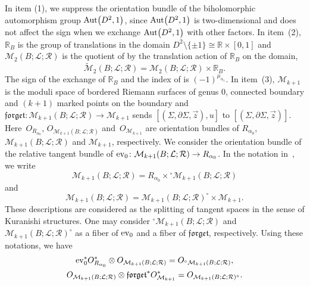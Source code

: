 \documentclass[pdftex]{sigma}
\numberwithin{equation}{section}
\theoremstyle{definition}
\begin{document}
In item (1), we suppress the orientation bundle of the biholomorphic automorphism group ${\rm Aut}\bigl(D^2, 1\bigr)$, since ${\rm Aut}\bigl(D^2, 1\bigr)$ is
two-dimensional and does not affect the sign when we exchange ${\rm Aut}\bigl(D^2, 1\bigr)$ with other factors.
In item~(2), ${\mathbb R}_B$ is the group of translations in the domain $D^2 \setminus \{\pm 1\} \cong {\mathbb R} \times [0,1]$ and
${\mathcal M}_{2}(B;{\mathcal L};{\mathcal R})$ is the quotient of
 by the translation action of ${\mathbb R}_B$ on the domain,
\[
\widetilde{\mathcal M}_{2}(B;{\mathcal L};{\mathcal R}) = {\mathcal M}_{2}(B;{\mathcal L};{\mathcal R}) \times {\mathbb R}_B.
\]
The sign of the exchange of ${\mathbb R}_B$ and the index of  is $(-1)^{\mu_{\alpha_1}}$.
In item~(3), ${\mathcal M}_{k+1}$ is the moduli space of bordered Riemann surfaces of genus 0, connected boundary and
$(k+1)$ marked points on the boundary
and $\mathfrak{forget}\colon {\mathcal M}_{k+1}(B;{\mathcal L};{\mathcal R}) \to {\mathcal M}_{k+1}$ sends $[(\Sigma, \partial \Sigma, \vec{z}),u]$
to $[(\Sigma, \partial \Sigma, \vec{z})]$.
Here~$O_{R_{\alpha_0}}$, $O_{{\mathcal M}_{k+1}(B;{\mathcal L};{\mathcal R})}$ and~$O_{{\mathcal M}_{k+1}}$ are orientation bundles of $R_{\alpha_0}$,
${\mathcal M}_{k+1}(B;{\mathcal L};{\mathcal R})$ and ${\mathcal M}_{k+1}$, respectively.
We consider  the orientation bundle of the relative
tangent bundle of ${\rm ev}_0\colon {\mathcal M}_{k+1}(B;{\mathcal L};{\mathcal R}) \to R_{\alpha_0}$.
In the notation in~\cite{FOOO09II}, we write
\[ {\mathcal M}_{k+1}(B;{\mathcal L};{\mathcal R}) = R_{\alpha_0} \times {}^{\circ} {\mathcal M}_{k+1}(B;{\mathcal L};{\mathcal R})\]
and
\[{\mathcal M}_{k+1}(B;{\mathcal L};{\mathcal R}) = {\mathcal M}_{k+1}(B;{\mathcal L};{\mathcal R})^{\circ} \times {\mathcal M}_{k+1}.\]
These descriptions are considered as the splitting of tangent spaces in the sense of Kuranishi structures.
One may consider $ {}^{\circ} {\mathcal M}_{k+1}(B;{\mathcal L};{\mathcal R})$ and ${\mathcal M}_{k+1}(B;{\mathcal L};{\mathcal R})^{\circ}$
as a fiber of ${\rm ev}_0$ and a fiber of $\mathfrak{forget}$, respectively.
Using these notations, we have
\begin{gather*}
 {\rm ev}_0^* O_{R_{\alpha_0}}^* \otimes O_{{\mathcal M}_{k+1}(B;{\mathcal L};{\mathcal R})}
= O_{ {}^{\circ} {\mathcal M}_{k+1}(B;{\mathcal L};{\mathcal R})},\\
O_{{\mathcal M}_{k+1}(B;{\mathcal L};{\mathcal R})} \otimes {\mathfrak{forget}}^* O_{{\mathcal M}_{k+1}}^* = O_{{\mathcal M}_{k+1}(B;{\mathcal L};{\mathcal R})^{\circ}}.
\end{gather*}
\end{document}
